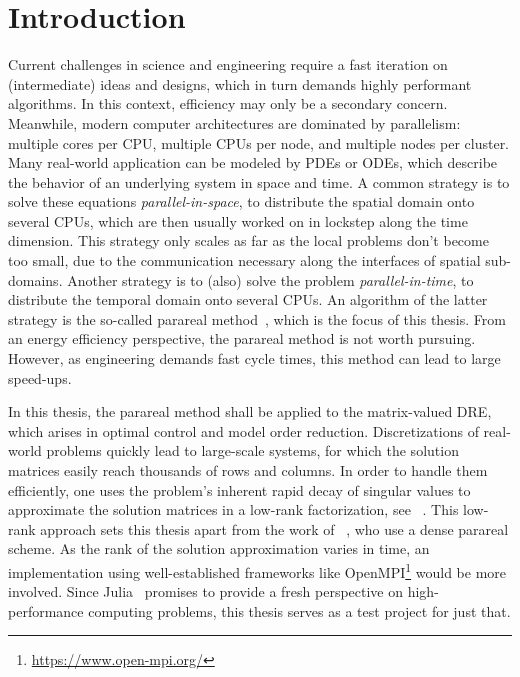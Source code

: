 \chapter{Introduction}

Current challenges in science and engineering require a fast iteration on (intermediate) ideas and designs,
which in turn demands highly performant algorithms.
In this context, efficiency may only be a secondary concern.
Meanwhile, modern computer architectures are dominated by parallelism:
multiple cores per CPU,
multiple CPUs per node,
and
multiple nodes per cluster.
Many real-world application can be modeled by \acp{PDE} or \acp{ODE},
which describe the behavior of an underlying system in space and time.
A common strategy is to solve these equations \emph{parallel-in-space},
\ie to distribute the spatial domain onto several CPUs,
which are then usually worked on in lockstep along the time dimension.
This strategy only scales as far as the local problems don't become too small,
due to the communication necessary along the interfaces of spatial sub-domains.
Another strategy is to (also) solve the problem \emph{parallel-in-time},
\ie to distribute the temporal domain onto several CPUs.
An algorithm of the latter strategy is the so-called parareal method~\cite{Lions2001},
which is the focus of this thesis.
From an energy efficiency perspective,
the parareal method is not worth pursuing.
However, as engineering demands fast cycle times,
this method can lead to large speed-ups.

In this thesis, the parareal method shall be applied to the matrix-valued \ac{DRE},
which arises \eg in optimal control and model order reduction.
Discretizations of real-world problems quickly lead to large-scale systems,
for which the solution matrices easily reach thousands of rows and columns.
In order to handle them efficiently,
one uses the problem's inherent rapid decay of singular values
to approximate the solution matrices in a low-rank factorization, see \eg~\cite{Penzl2000,Kuerschner2016,Lang2017}.
This low-rank approach sets this thesis apart from the work of \citeauthor{Koehler2016}~\cite{Koehler2016},
who use a dense parareal scheme.
As the rank of the solution approximation varies in time,
an implementation using well-established frameworks like OpenMPI\footnote{\url{https://www.open-mpi.org/}}
would be more involved.
Since Julia~\cite{Julia} promises to provide a fresh perspective on high-performance computing problems,
this thesis serves as a test project for just that.


